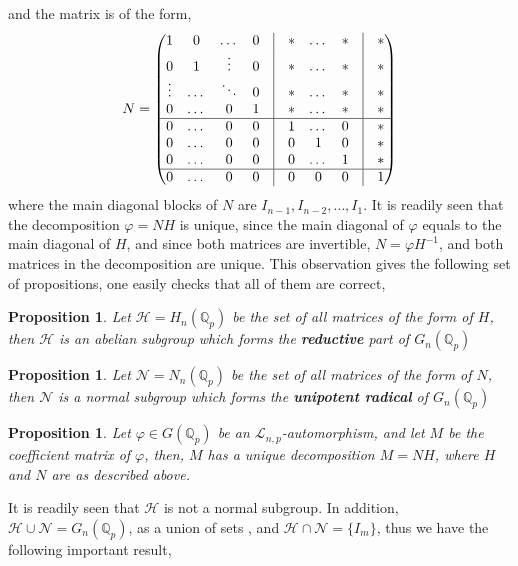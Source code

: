 \documentclass[12pt]{article}
\newtheorem{proposition}[theorem]{Proposition}
\begin{document}
and the matrix is of the form, \[N=\begin{pmatrix}
1 &0 &\dots &0 &\vline &* &\dots &* &\vline& *\\
0& 1 &\vdots &0 &\vline&* &\dots &* &\vline&*\\
\vdots& \dots& \ddots & 0&\vline& *& \dots& *&\vline & *\\
0& \dots& 0& 1&\vline & * & \dots & * &\vline & *\\
\hline
0&\dots &0 & 0& \vline &1&\dots &0&\vline&*\\
0&\dots &0 & 0& \vline & 0 & 1 & 0 &\vline &*\\
0&\dots &0 & 0& \vline & 0 & \dots & 1 &\vline &*\\
\hline
0&\dots &0 & 0& \vline & 0 & 0 & 0 &\vline &1\\
\end{pmatrix}
\]
where the main diagonal blocks of $N$ are $I_{n-1},I_{n-2},\dots,I_1$. It is readily seen that the decomposition $\varphi=NH$ is unique, since the main diagonal of $\varphi$ equals to the main diagonal of $H$, and since both matrices are invertible, $N=\varphi H^{-1}$, and both matrices in the decomposition are unique.
This observation gives the following set of propositions, one easily checks that all of them are correct,
\begin{proposition}
\label{prop.automorphism.subgroup.h}
Let $\mathcal{H}=H_n(\mathbb{Q}_p)$ be the set of all matrices of the form of $H$, then $\mathcal{H}$ is an abelian subgroup which forms the \textbf{reductive} part of $G_n(\mathbb{Q}_p)$
\end{proposition}
\begin{proposition}
\label{prop.automorphism.subgroup.n}
Let $\mathcal{N}=N_n(\mathbb{Q}_p)$ be the set of all matrices of the form of $N$, then $\mathcal{N}$ is a normal subgroup which forms the \textbf{unipotent radical} of $G_n(\mathbb{Q}_p)$
\end{proposition}
\begin{proposition}
\label{prop.automorphism.matrix.decomposition}
Let $\varphi\in G(\mathbb{Q}_p)$ be an $\mathcal{L}_{n,p}$-automorphism, and let $M$ be the coefficient matrix of $\varphi$, then, $M$ has a unique decomposition $M=NH$, where $H$ and $N$ are as described above.
\end{proposition}
It is readily seen that $\mathcal{H}$ is not a normal subgroup. In addition, $\mathcal{H}\cup \mathcal{N}=G_n(\mathbb{Q}_p)$, as a union of sets , and $\mathcal{H}\cap \mathcal{N}=\{I_m\}$, thus we have the following important result,
\end{document}
